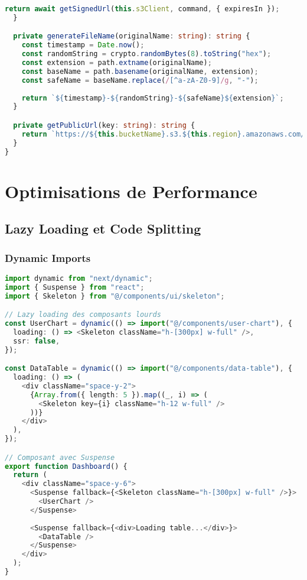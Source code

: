 \begin{lstlisting}[language=TypeScript, caption=Configuration S3 Client]
    return await getSignedUrl(this.s3Client, command, { expiresIn });
  }

  private generateFileName(originalName: string): string {
    const timestamp = Date.now();
    const randomString = crypto.randomBytes(8).toString("hex");
    const extension = path.extname(originalName);
    const baseName = path.basename(originalName, extension);
    const safeName = baseName.replace(/[^a-zA-Z0-9]/g, "-");
    
    return `${timestamp}-${randomString}-${safeName}${extension}`;
  }

  private getPublicUrl(key: string): string {
    return `https://${this.bucketName}.s3.${this.region}.amazonaws.com/${key}`;
  }
}
\end{lstlisting}

\section{Optimisations de Performance}

\subsection{Lazy Loading et Code Splitting}

\subsubsection{Dynamic Imports}

\begin{lstlisting}[language=TypeScript, caption=Implémentation du Lazy Loading]
import dynamic from "next/dynamic";
import { Suspense } from "react";
import { Skeleton } from "@/components/ui/skeleton";

// Lazy loading des composants lourds
const UserChart = dynamic(() => import("@/components/user-chart"), {
  loading: () => <Skeleton className="h-[300px] w-full" />,
  ssr: false,
});

const DataTable = dynamic(() => import("@/components/data-table"), {
  loading: () => (
    <div className="space-y-2">
      {Array.from({ length: 5 }).map((_, i) => (
        <Skeleton key={i} className="h-12 w-full" />
      ))}
    </div>
  ),
});

// Composant avec Suspense
export function Dashboard() {
  return (
    <div className="space-y-6">
      <Suspense fallback={<Skeleton className="h-[300px] w-full" />}>
        <UserChart />
      </Suspense>
      
      <Suspense fallback={<div>Loading table...</div>}>
        <DataTable />
      </Suspense>
    </div>
  );
}
\end{lstlisting}

